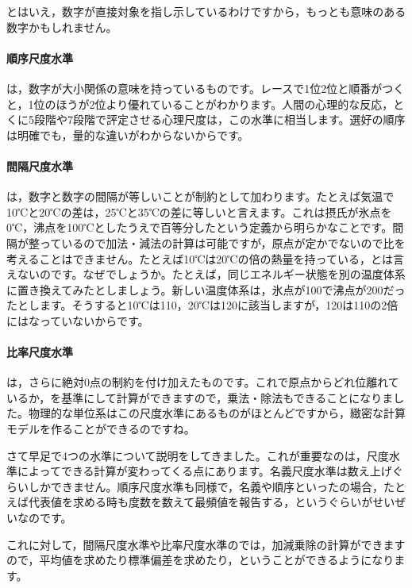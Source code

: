 \documentclass{ltjsbook}
\begin{document}
とはいえ，数字が直接対象を指し示しているわけですから，もっとも意味のある数字かもしれません。

\paragraph{順序尺度水準} は，数字が大小関係の意味を持っているものです。レースで1位2位と順番がつくと，1位のほうが2位より優れていることがわかります。人間の心理的な反応，とくに5段階や7段階で評定させる心理尺度は，この水準に相当します。選好の順序は明確でも，量的な違いがわからないからです。

\paragraph{間隔尺度水準} は，数字と数字の間隔が等しいことが制約として加わります。たとえば気温で10℃と20℃の差は，25℃と35℃の差に等しいと言えます。これは摂氏が氷点を0℃，沸点を100℃としたうえで百等分したという定義から明らかなことです。間隔が整っているので加法・減法の計算は可能ですが，原点が定かでないので比を考えることはできません。たとえば10℃は20℃の倍の熱量を持っている，とは言えないのです。なぜでしょうか。たとえば，同じエネルギー状態を別の温度体系に置き換えてみたとしましょう。新しい温度体系は，氷点が100で沸点が200だったとします。そうすると10℃は110，20℃は120に該当しますが，120は110の2倍にはなっていないからです。

\paragraph{比率尺度水準}  は，さらに絶対0点の制約を付け加えたものです。これで原点からどれ位離れているか，を基準にして計算ができますので，乗法・除法もできることになりました。物理的な単位系はこの尺度水準にあるものがほとんどですから，緻密な計算モデルを作ることができるのですね。

さて早足で4つの水準について説明をしてきました。これが重要なのは，尺度水準によってできる計算が変わってくる点にあります。名義尺度水準は数え上げぐらいしかできません。順序尺度水準も同様で，名義や順序といったの場合，たとえば代表値を求める時も度数を数えて最頻値を報告する，というぐらいがせいぜいなのです。

これに対して，間隔尺度水準や比率尺度水準のでは，加減乗除の計算ができますので，平均値を求めたり標準偏差を求めたり，ということができるようになります。
\end{document}
